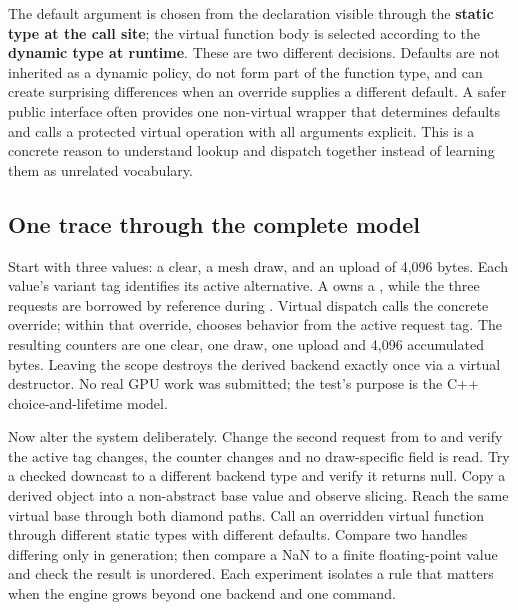 The default argument is chosen from the declaration visible through the \textbf{static type at the call site}; the virtual function body is selected according to the \textbf{dynamic type at runtime}. These are two different decisions. Defaults are not inherited as a dynamic policy, do not form part of the function type, and can create surprising differences when an override supplies a different default. A safer public interface often provides one non-virtual wrapper that determines defaults and calls a protected virtual operation with all arguments explicit. This is a concrete reason to understand lookup and dispatch together instead of learning them as unrelated vocabulary.

\subsection{One trace through the complete model}\label{01-foundations-i-ch004-one-trace-through-the-complete-model}

\hypertarget{01-foundations-i-ch004-one-trace-through-the-complete-model}{}

Start with three  values: a clear, a mesh draw, and an upload of 4,096 bytes. Each value's variant tag identifies its active alternative. A  owns a , while the three requests are borrowed by reference during . Virtual dispatch calls the concrete override; within that override,  chooses behavior from the active request tag. The resulting counters are one clear, one draw, one upload and 4,096 accumulated bytes. Leaving the scope destroys the derived backend exactly once via a virtual destructor. No real GPU work was submitted; the test's purpose is the C++ choice-and-lifetime model.

Now alter the system deliberately. Change the second request from  to  and verify the active tag changes, the counter changes and no draw-specific field is read. Try a checked downcast to a different backend type and verify it returns null. Copy a derived object into a non-abstract base value and observe slicing. Reach the same virtual base through both diamond paths. Call an overridden virtual function through different static types with different defaults. Compare two handles differing only in generation; then compare a NaN to a finite floating-point value and check the result is unordered. Each experiment isolates a rule that matters when the engine grows beyond one backend and one command.

